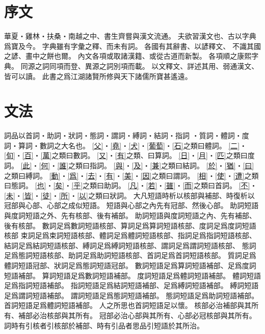 \chapter*{序文}
華夏・雞林・扶桑・南越之中、書生齊嘗與漢文流通。
夫欲習漢文也、古以字典爲寶及今。
字典雖有字彙之釋、而未有詞。
各國有其辭書、以諺釋文、
不識其國之諺、畫中之餅也爾。
內文各項或取諸漢籍、或從古道而新製。
各項順之康熙字典。
同源之詞同項而登、異源之詞別項而載。
以文釋文、詳述其用、弱通漢文、皆可以讀。
此書之爲江湖諸賢所修與天下諸儒所寶甚遙遠。
\chapter*{文法}
詞品以首詞・助詞・狀詞・態詞・謂詞・縛詞・結詞・指詞
・質詞・體詞・度詞・算詞・數詞之大名也。
\cref{父}・\cref{堯}・\cref{犬}・\cref{葡萄}・\cref{石}之類曰體詞。
\cref{二}・\cref{旬}・\cref{百}・\cref{萬}之類曰數詞。
\cref{又}・\cref{有}之類、曰算詞。
\cref{日}・\cref{月}・\cref{匹}之類曰度詞。
\cref{此}・\cref{何}・\cref{誰}之類曰指詞。
\cref{與}・\cref{及}・\cref{兼}之類曰結詞。
\cref{於}・\cref{猶}・\cref{曰}之類曰縛詞。
\cref{動}・\cref{爲}・\cref{去}・\cref{有}・\cref{美}・\cref{因}之類曰謂詞。
\cref{相}・\cref{使}・\cref{遭}之類曰態詞。
\cref{也}・\cref{矣}・\cref{乎}之類曰助詞。
\cref{凡}・\cref{若}・\cref{雖}・\cref{而}之類曰首詞。
\cref{不}・\cref{未}・\cref{皆}・\cref{徒}・\cref{所}・\cref{以}之類曰狀詞。
大凡短語時析以核部與補部、時復析以冠部與心部、心部之成似短語。
短語與心部之內先有冠部、然後心部。
助詞短語與度詞短語之外、先有核部、後有補部。
助詞短語與度詞短語之內、先有補部、後有核部。
數詞足爲數詞短語核部、算詞足爲算詞短語核部、度詞足爲度詞短語核部
束詞足爲束詞短語核部、體詞足爲體詞短語核部、指詞足爲指詞短語核部、
結詞足爲結詞短語核部、縛詞足爲縛詞短語核部、謂詞足爲謂詞短語核部、
態詞足爲態詞短語核部、助詞足爲助詞短語核部、首詞足爲首詞短語核部。
質詞足爲體詞短語冠部、狀詞足爲態詞短語冠部。
數詞短語足爲算詞短語補部、足爲度詞短語補部。
算詞短語足爲數詞短語補部。
度詞短語足爲體詞短語補部。
體詞短語足爲指詞短語補部。
指詞短語足爲結詞短語補部、足爲縛詞短語補部。
縛詞短語足爲謂詞短語補部。
謂詞短語足爲態詞短語補部。
態詞短語足爲助詞短語補部。
首詞短語足爲體詞短語補部。
人之所思也首詞短語足以懷。
核部必治補部與其所有、補部必治核部與其所有。
冠部必治心部與其所有、心部必冠核部與其所有。
詞時有引核者引核部於補部、時有引品者思品引短語於其所治。

